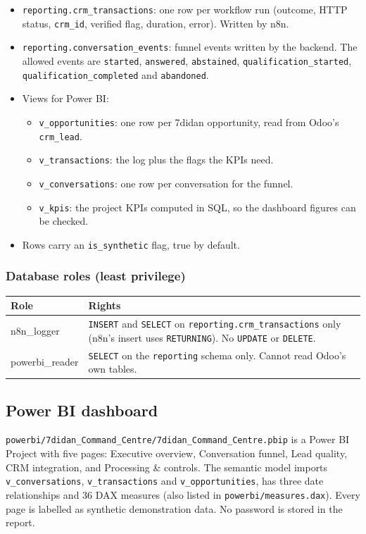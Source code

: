 \documentclass[11pt,a4paper]{article}
\newcommand{\f}[1]{\texttt{#1}}
\begin{document}
\begin{itemize}
  \item \f{reporting.crm\_transactions}: one row per workflow run (outcome, HTTP status, \f{crm\_id},
        verified flag, duration, error). Written by n8n.
  \item \f{reporting.conversation\_events}: funnel events written by the backend. The allowed events
        are \f{started}, \f{answered}, \f{abstained}, \f{qualification\_started},
        \f{qualification\_completed} and \f{abandoned}.
  \item Views for Power BI:
        \begin{itemize}
          \item \f{v\_opportunities}: one row per 7didan opportunity, read from Odoo's \f{crm\_lead}.
          \item \f{v\_transactions}: the log plus the flags the KPIs need.
          \item \f{v\_conversations}: one row per conversation for the funnel.
          \item \f{v\_kpis}: the project KPIs computed in SQL, so the dashboard figures can be checked.
        \end{itemize}
  \item Rows carry an \f{is\_synthetic} flag, true by default.
\end{itemize}

\subsubsection*{Database roles (least privilege)}
\begin{tabularx}{\textwidth}{>{\ttfamily}l Y}
  \toprule
  \textrm{\textbf{Role}} & \textbf{Rights} \\
  \midrule
  n8n\_logger & \f{INSERT} and \f{SELECT} on \f{reporting.crm\_transactions} only (n8n's insert uses \f{RETURNING}). No \f{UPDATE} or \f{DELETE}. \\
  powerbi\_reader & \f{SELECT} on the \f{reporting} schema only. Cannot read Odoo's own tables. \\
  \bottomrule
\end{tabularx}

\subsection{Power BI dashboard}

\f{powerbi/7didan\_Command\_Centre/7didan\_Command\_Centre.pbip} is a Power BI Project with five
pages: Executive overview, Conversation funnel, Lead quality, CRM integration, and Processing \&
controls. The semantic model imports \f{v\_conversations}, \f{v\_transactions} and
\f{v\_opportunities}, has three date relationships and 36 DAX measures (also listed in
\f{powerbi/measures.dax}). Every page is labelled as synthetic demonstration data. No password is
stored in the report.
\end{document}
